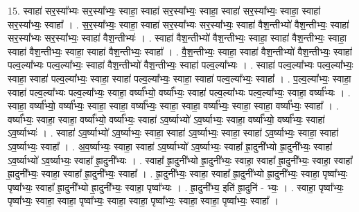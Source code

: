 \documentclass[17pt]{extarticle}
\begin{document}
15. स्वाहा॑ सर॒स्या᳚भ्यः सर॒स्या᳚भ्यः॒ स्वाहा॒ स्वाहा॑ सर॒स्या᳚भ्यः॒ स्वाहा॒ स्वाहा॑ सर॒स्या᳚भ्यः॒ स्वाहा॒ स्वाहा॑ सर॒स्या᳚भ्यः॒ स्वाहा᳚ । . स॒र॒स्या᳚भ्यः॒ स्वाहा॒ स्वाहा॑ सर॒स्या᳚भ्यः सर॒स्या᳚भ्यः॒ स्वाहा॑ वैश॒न्तीभ्यो॑ वैश॒न्तीभ्यः॒ स्वाहा॑ सर॒स्या᳚भ्यः सर॒स्या᳚भ्यः॒ स्वाहा॑ वैश॒न्तीभ्यः॑ । . स्वाहा॑ वैश॒न्तीभ्यो॑ वैश॒न्तीभ्यः॒ स्वाहा॒ स्वाहा॑ वैश॒न्तीभ्यः॒ स्वाहा॒ स्वाहा॑ वैश॒न्तीभ्यः॒ स्वाहा॒ स्वाहा॑ वैश॒न्तीभ्यः॒ स्वाहा᳚ । . वै॒श॒न्तीभ्यः॒ स्वाहा॒ स्वाहा॑ वैश॒न्तीभ्यो॑ वैश॒न्तीभ्यः॒ स्वाहा॑ पल्व॒ल्या᳚भ्यः पल्व॒ल्या᳚भ्यः॒ स्वाहा॑ वैश॒न्तीभ्यो॑ वैश॒न्तीभ्यः॒ स्वाहा॑ पल्व॒ल्या᳚भ्यः । . स्वाहा॑ पल्व॒ल्या᳚भ्यः पल्व॒ल्या᳚भ्यः॒ स्वाहा॒ स्वाहा॑ पल्व॒ल्या᳚भ्यः॒ स्वाहा॒ स्वाहा॑ पल्व॒ल्या᳚भ्यः॒ स्वाहा॒ स्वाहा॑ पल्व॒ल्या᳚भ्यः॒ स्वाहा᳚ । . प॒ल्व॒ल्या᳚भ्यः॒ स्वाहा॒ स्वाहा॑ पल्व॒ल्या᳚भ्यः पल्व॒ल्या᳚भ्यः॒ स्वाहा॒ वर्ष्या᳚भ्यो॒ वर्ष्या᳚भ्यः॒ स्वाहा॑ पल्व॒ल्या᳚भ्यः पल्व॒ल्या᳚भ्यः॒ स्वाहा॒ वर्ष्या᳚भ्यः । . स्वाहा॒ वर्ष्या᳚भ्यो॒ वर्ष्या᳚भ्यः॒ स्वाहा॒ स्वाहा॒ वर्ष्या᳚भ्यः॒ स्वाहा॒ स्वाहा॒ वर्ष्या᳚भ्यः॒ स्वाहा॒ स्वाहा॒ वर्ष्या᳚भ्यः॒ स्वाहा᳚ । . वर्ष्या᳚भ्यः॒ स्वाहा॒ स्वाहा॒ वर्ष्या᳚भ्यो॒ वर्ष्या᳚भ्यः॒ स्वाहा॑ ऽव॒र्ष्याभ्यो॑ ऽव॒र्ष्याभ्यः॒ स्वाहा॒ वर्ष्या᳚भ्यो॒ वर्ष्या᳚भ्यः॒ स्वाहा॑ ऽव॒र्ष्याभ्यः॑ । . स्वाहा॑ ऽव॒र्ष्याभ्यो॑ ऽव॒र्ष्याभ्यः॒ स्वाहा॒ स्वाहा॑ ऽव॒र्ष्याभ्यः॒ स्वाहा॒ स्वाहा॑ ऽव॒र्ष्याभ्यः॒ स्वाहा॒ स्वाहा॑ ऽव॒र्ष्याभ्यः॒ स्वाहा᳚ । . अ॒व॒र्ष्याभ्यः॒ स्वाहा॒ स्वाहा॑ ऽव॒र्ष्याभ्यो॑ ऽव॒र्ष्याभ्यः॒ स्वाहा᳚ ह्रा॒दुनी᳚भ्यो ह्रा॒दुनी᳚भ्यः॒ स्वाहा॑ ऽव॒र्ष्याभ्यो॑ ऽव॒र्ष्याभ्यः॒ स्वाहा᳚ ह्रा॒दुनी᳚भ्यः । . स्वाहा᳚ ह्रा॒दुनी᳚भ्यो ह्रा॒दुनी᳚भ्यः॒ स्वाहा॒ स्वाहा᳚ ह्रा॒दुनी᳚भ्यः॒ स्वाहा॒ स्वाहा᳚ ह्रा॒दुनी᳚भ्यः॒ स्वाहा॒ स्वाहा᳚ ह्रा॒दुनी᳚भ्यः॒ स्वाहा᳚ । . ह्रा॒दुनी᳚भ्यः॒ स्वाहा॒ स्वाहा᳚ ह्रा॒दुनी᳚भ्यो ह्रा॒दुनी᳚भ्यः॒ स्वाहा॒ पृष्वा᳚भ्यः॒ पृष्वा᳚भ्यः॒ स्वाहा᳚ ह्रा॒दुनी᳚भ्यो ह्रा॒दुनी᳚भ्यः॒ स्वाहा॒ पृष्वा᳚भ्यः । . ह्रा॒दुनी᳚भ्य॒ इति॑ ह्रा॒दुनि॑ - भ्यः॒ । . स्वाहा॒ पृष्वा᳚भ्यः॒ पृष्वा᳚भ्यः॒ स्वाहा॒ स्वाहा॒ पृष्वा᳚भ्यः॒ स्वाहा॒ स्वाहा॒ पृष्वा᳚भ्यः॒ स्वाहा॒ स्वाहा॒ पृष्वा᳚भ्यः॒ स्वाहा᳚ । \newline
\end{document}
